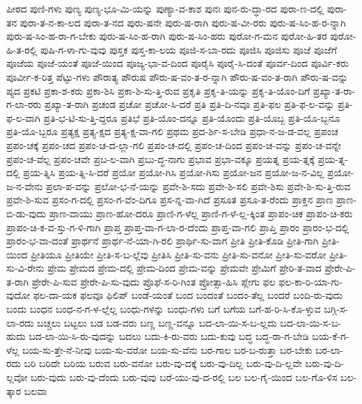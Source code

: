 {ಪೀಠದ
ಪುಣಿ-ಗಳು
ಪುಣ್ಯ
ಪುಣ್ಯ-ಭೂ-ಮಿ-ಯನ್ನು
ಪುಣ್ಯಾ-ವ-ಕಾಶ
ಪುನಃ
ಪುನ-ರು-ದ್ಧಾ-ರದ
ಪುರಾ-ಣ-ದಲ್ಲಿ
ಪುರಾ-ತನ
ಪುರಾ-ತ-ನ-ಕಾ-ಲದ
ಪುರಾ-ತ-ನದ
ಪುರು-ಷನೇ
ಪುರು-ಷ-ರಾಗಿ
ಪುರು-ಷ-ವೀ-ರರು
ಪುರು-ಷ-ಸಿಂ-ಹ-ರ-ನ್ನಾಗಿ
ಪುರು-ಷ-ಸಿಂ-ಹ-ರಾ-ಗ-ಬೇಕು
ಪುರು-ಷ-ಸಿಂ-ಹ-ರಾಗಿ
ಪುರು-ಷ-ಸಿಂ-ಹರು
ಪುರೋ-ಗ-ಮನ
ಪುರೋ-ಹಿ-ತರ
ಪುರೋ-ಹಿ-ತ-ರಲ್ಲಿ
ಪುಷಿ-ಗ-ಳಾ-ಗು-ವುವು
ಪುಸ್ತಕ
ಪುಸ್ತ-ಕಾ-ಲಯ
ಪೂಜಿ-ಸ-ಬಾ-ರದು
ಪೂಜಿಸಿ
ಪೂಜಿಸು
ಪೂಜೆ
ಪೂಜೆಗೆ
ಪೂಜೆಯ
ಪೂಜೆ-ಯಂತೆ
ಪೂಜೆ-ಯಿಂದ
ಪೂಜ್ಯ-ಭಾ-ವ-ದಿಂದ
ಪೂರೈಸಿ
ಪೂರೈ-ಸಿ-ದಂತೆ
ಪೂರ್ವ-ದಿಂದ
ಪೂರ್ವಿ-ಕರು
ಪೂರ್ವೀ-ಕ-ರಿತ್ತ
ಪೆಟ್ಟು-ಗಳು
ಪೌರಾತ್ಯ
ಪೌರುಷ
ಪೌರು-ಷ-ವಂ-ತ-ರ-ನ್ನಾಗಿ
ಪೌರು-ಷ-ವಂ-ತ-ರಾಗಿ
ಪೌರು-ಷ-ವನ್ನು
ಪ್ಯದ
ಪ್ರಕಟಿ
ಪ್ರಕಾ-ಶ-ಕರು
ಪ್ರಕಾ-ಶಿಸಿ
ಪ್ರಕಾ-ಶಿ-ಸು-ತ್ತಿ-ರುವ
ಪ್ರಕೃತಿ
ಪ್ರಕೃ-ತಿ-ಯನ್ನು
ಪ್ರಕೃ-ತಿ-ಯೊಂ-ದಿಗೆ
ಪ್ರಖ್ಯಾ-ತ-ರಾ-ಗ-ಲಾ-ರರು
ಪ್ರಖ್ಯಾ-ತ-ರಾಗಿ
ಪ್ರಚಂಡ
ಪ್ರಚೋ
ಪ್ರಚೋ-ಸಿ-ದರೆ
ಪ್ರತಿ
ಪ್ರತಿ-ದಿ-ನವೂ
ಪ್ರತಿ-ಫಲ
ಪ್ರತಿ-ಫ-ಲ-ವನ್ನು
ಪ್ರತಿ-ಫ-ಲ-ವಾಗಿ
ಪ್ರತಿ-ಭ-ಟಿ-ಸು-ತ್ತಿ-ದ್ದರೂ
ಪ್ರತಿಭೆ
ಪ್ರತಿ-ಯೊಂ-ದನ್ನೂ
ಪ್ರತಿ-ಯೊಂದು
ಪ್ರತಿ-ಯೊಬ್ಬ
ಪ್ರತಿ-ಯೊ-ಬ್ಬನೂ
ಪ್ರತಿ-ಯೊ-ಬ್ಬರೂ
ಪ್ರತ್ಯಕ್ಷ
ಪ್ರತ್ಯ-ಕ್ಷದ
ಪ್ರತ್ಯ-ಕ್ಷ-ವಾ-ಗಲಿ
ಪ್ರಥಮ
ಪ್ರದ-ರ್ಶಿ-ಸ-ಬೇಡಿ
ಪ್ರಧಾ-ನ-ಜ-ಡ-ವಲ್ಲ
ಪ್ರಪಂಚ
ಪ್ರಪಂ-ಚಕ್ಕೆ
ಪ್ರಪಂ-ಚದ
ಪ್ರಪಂ-ಚ-ದ-ಲ್ಲಾ-ಗಲಿ
ಪ್ರಪಂ-ಚ-ದಲ್ಲಿ
ಪ್ರಪಂ-ಚ-ದಿಂದ
ಪ್ರಪಂ-ಚ-ವನ್ನು
ಪ್ರಪಂ-ಚ-ವನ್ನೇ
ಪ್ರಪಂ-ಚ-ವೆಲ್ಲ
ಪ್ರಪಂ-ಚವೇ
ಪ್ರಬ-ಲ-ವಾಗಿ
ಪ್ರಬು-ದ್ಧ-ನಾಗು
ಪ್ರಭಾವ
ಪ್ರಭಾ-ವಕ್ಕೂ
ಪ್ರಯತ್ನ
ಪ್ರಯ-ತ್ನಕ್ಕೆ
ಪ್ರಯ-ತ್ನ-ದಲ್ಲಿ
ಪ್ರಯ-ತ್ನಿಸಿ
ಪ್ರಯ-ತ್ನಿ-ಸಿ-ದರೆ
ಪ್ರಯೋ
ಪ್ರಯೋ-ಗಿಸಿ
ಪ್ರಯೋ-ಗಿಸು
ಪ್ರಯೋ-ಜನ
ಪ್ರಯೋ-ಜ-ನ-ವಿಲ್ಲ
ಪ್ರಯೋ-ಜ-ನ-ವೇನು
ಪ್ರಲಾ-ಪ-ವನ್ನು
ಪ್ರಲೋ-ಭ-ನೆ-ಯನ್ನು
ಪ್ರವೇ-ಶಿ-ಸದು
ಪ್ರವೇ-ಶಿ-ಸಲಿ
ಪ್ರವೇ-ಶಿಸು
ಪ್ರವೇ-ಶಿ-ಸು-ತ್ತಿ-ರುವ
ಪ್ರವೇ-ಶಿ-ಸುವ
ಪ್ರಸಂ-ಗ-ದಲ್ಲಿ
ಪ್ರಸಂ-ಗ-ವೆಂ-ದಿಗೂ
ಪ್ರಸ-ನ್ನ-ವಾ-ಗಿದೆ
ಪ್ರಸೂತ
ಪ್ರಸೂ-ತ-ರೆಂದು
ಪ್ರಾಕ್ತನ
ಪ್ರಾಣ
ಪ್ರಾಣ-ಬಿ-ಡು-ವುದು
ಪ್ರಾಣ-ವಾಯು
ಪ್ರಾಣ-ಹೋ-ದರೂ
ಪ್ರಾಣಿ-ಗ-ಳೆಲ್ಲ
ಪ್ರಾಣಿ-ಗ-ಳೆ-ಲ್ಲ-ಕ್ಕಿಂತ
ಪ್ರಾಪಂ-ಚಿಕ
ಪ್ರಾಪಂ-ಚಿ-ಕರು
ಪ್ರಾಪಂ-ಚಿ-ಕ-ವ-ಸ್ತು-ಗ-ಳಿ-ಗಾಗಿ
ಪ್ರಾಪ್ತ
ಪ್ರಾಪ್ತ-ವಾ-ಗ-ಲಾ-ರ-ದೆಂದು
ಪ್ರಾಪ್ತ-ವಾ-ಗಲಿ
ಪ್ರಾಪ್ತಿ
ಪ್ರಾರಂ
ಪ್ರಾರಂ-ಭ-ದಲ್ಲಿ
ಪ್ರಾರಂ-ಭ-ವಾ-ದಂತೆ
ಪ್ರಾರ್ಥನೆ
ಪ್ರಾರ್ಥ-ನೆ-ಯಾ-ಗಿ-ರಲಿ
ಪ್ರಾರ್ಥಿ-ಸು-ವಾಗ
ಪ್ರೀತಿ
ಪ್ರೀತಿ-ಕೊಡಿ
ಪ್ರೀತಿ-ಗಾಗಿ
ಪ್ರೀತಿ-ಯಿಂದ
ಪ್ರೀತಿಯೂ
ಪ್ರೀತಿಯೇ
ಪ್ರೀತಿ-ಸ-ಬ-ಲ್ಲೆವು
ಪ್ರೀತಿಸಿ
ಪ್ರೀತಿ-ಸು-ವನು
ಪ್ರೀತಿ-ಸು-ವನೋ
ಪ್ರೀತಿ-ಸು-ವರೋ
ಪ್ರೀತಿ-ಸು-ವಿ-ರೇನು
ಪ್ರೇಮ
ಪ್ರೇಮದ
ಪ್ರೇಮ-ದಲ್ಲಿ
ಪ್ರೇಮ-ದಿಂದ
ಪ್ರೇಮ-ವನ್ನು
ಪ್ರೇಮವೇ
ಪ್ರೇಮಿಗೆ
ಪ್ರೇರಿ-ತ-ವಾದ
ಪ್ರೇರೇ-ಪಿ-ತ-ರಾಗಿ
ಪ್ರೇರೇ-ಪಿ-ಸುವ
ಪ್ರೇರೇ-ಪಿ-ಸು-ವುದು
ಪ್ರೊಫೆ-ಸ-ರಿ-ಗಿಂತ
ಪ್ರೋತ್ಸಾ-ಹಿಸಿ
ಪ್ಲೇಗು
ಫಲ
ಫಲ-ಕಾ-ರಿ-ಯಾ-ಗು-ವುದೋ
ಫಲ-ದಾ-ಯಕ
ಫಲವೂ
ಫಿಲಿಪ್
ಬಂಡೆ-ಯಂತೆ
ಬಂದ
ಬಂದಂತೆ
ಬಂದಂ-ತೆಲ್ಲ
ಬಂದರೆ
ಬಂದಿ-ರು-ವುದು
ಬಂದು
ಬಂಧನ
ಬಂಧ-ನ-ಗ-ಳ-ಲ್ಲೆಲ್ಲ
ಬಂಧು-ಗಳನ್ನು
ಬಂಧು-ಗಳು
ಬಗೆ
ಬಗೆಯ
ಬಗೆ-ಹ-ರಿ-ಸಿ-ಕೊ-ಳ್ಳುವ
ಬಗ್ಗಿ-ಸ-ಲಾ-ರದು
ಬಚ್ಚಲು
ಬಟ್ಟಲು
ಬಡ
ಬಡ-ವರು
ಬಣ್ಣ
ಬಣ್ಣ-ವನ್ನೂ
ಬದ-ಲಾ-ಯಿ-ಸ-ಬ-ಲ್ಲದು
ಬದ-ಲಾ-ಯಿ-ಸ-ಬ-ಹುದು
ಬದ-ಲಾ-ಯಿ-ಸಿ-ರು-ವುದನ್ನು
ಬದಲು
ಬದು-ಕಿ-ರು-ವರು
ಬದು-ಕುವು
ಬದ್ಧ
ಬದ್ಧ-ರಾ-ಗ-ಬೇಡಿ
ಬಯ-ಕೆ-ಗ-ಳೆಲ್ಲ
ಬಯ-ಸು-ತ್ತೇ-ನೆ-ನೀವು
ಬಯ-ಸು-ವರೋ
ಬಯ-ಸು-ವೆನು
ಬರ-ಗಾಲ
ಬರ-ಬ-ರುತ್ತಾ
ಬರ-ಬೇಕು
ಬರ-ಲಾ-ರದು
ಬರಿ
ಬರಿದೇ
ಬರಿಯ
ಬರುವ
ಬರು-ವನೋ
ಬರು-ವು-ದಕ್ಕೆ
ಬರು-ವು-ದಿಲ್ಲ
ಬರು-ವು-ದಿ-ಲ್ಲವೇ
ಬರು-ವು-ದಿ-ಲ್ಲವೋ
ಬರು-ವುದು
ಬರು-ವು-ದೆಂದು
ಬರು-ವುವು
ಬರೆ-ಯು-ವು-ದ-ರಲ್ಲಿ
ಬಲ
ಬಲ-ಗೈ-ಯಿಂದ
ಬಲ-ಗೊ-ಳಿಸ
ಬಲ-ತ್ಕಾರ
ಬಲವಾ
}
